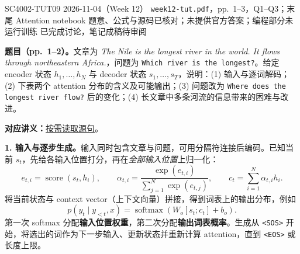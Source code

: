 
\begingroup
\linespread{1.15}\selectfont
\setlength{\parskip}{0.4em}
\renewcommand{\recordid}[1]{}
\renewcommand{\relatedtopic}[2]{\hyperref[topic:#1]{#2}}
\label{tutorial:SC4002-TUT09}

\tutorialmeta
  {SC4002-TUT09}
  {2026-11-04（Week 12）}
  {\texttt{week12-tut.pdf}，pp.~1--3，Q1--Q3；末尾 Attention notebook}
  {题意、公式与源码已核对；未提供官方答案；编程部分未运行训练}
  {已完成讨论，笔记成稿待审阅}

\nopagebreak[4]
\textbf{题目（pp.~1--2）。}文章为 \emph{The Nile is the longest river in the world. It flows through northeastern Africa.}，问题为 \texttt{Which river is the longest?}。给定 encoder 状态 $h_1,\ldots,h_N$ 与 decoder 状态 $s_1,\ldots,s_T$，说明：(1) 输入与逐词解码；(2) 下表两个 attention 分布的含义及可能输出；(3) 问题改为 \texttt{Where does the longest river flow?} 后的变化；(4) 长文章中多条河流的信息带来的困难与改进。

\textbf{对应讲义：}\relatedtopic{SC4002-L11-T01}{按需读取源句}。

\textbf{1. 输入与逐步生成。}输入同时包含文章与问题，可用分隔符连接后编码。已知当前 $s_t$，先给各输入位置打分，再在\emph{全部输入位置}上归一化：
\[
 e_{t,i}=\operatorname{score}(s_t,h_i),\qquad
 \alpha_{t,i}=\frac{\exp(e_{t,i})}{\sum_{j=1}^{N}\exp(e_{t,j})},\qquad
 c_t=\sum_{i=1}^{N}\alpha_{t,i}h_i.
\]
将当前状态与 context vector（上下文向量）拼接，得到词表上的输出分布，例如
\[
 p(y_t\mid y_{<t},x)=\operatorname{softmax}\!\left(W_o[s_t;c_t]+b_o\right).
\]
第一次 softmax 分配\textbf{输入位置权重}，第二次分配\textbf{输出词表概率}。生成从 \texttt{<SOS>} 开始，将选出的词作为下一步输入、更新状态并重新计算 attention，直到 \texttt{<EOS>} 或长度上限。

